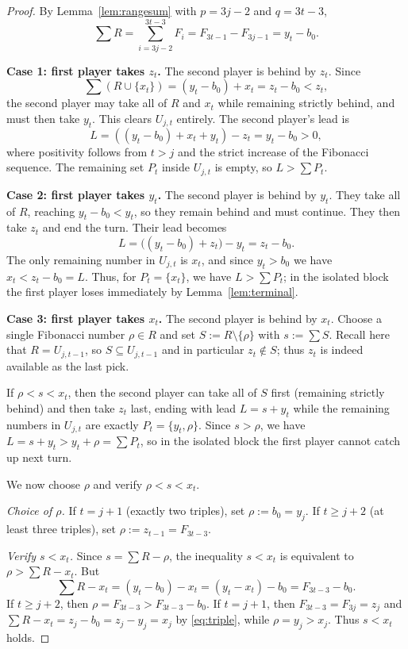 \documentclass[11pt]{article}
\begin{document}
\begin{proof}
By Lemma~\ref{lem:rangesum} with $p=3j-2$ and $q=3t-3$,
\[
\sum R=\sum_{i=3j-2}^{3t-3}F_i = F_{3t-1}-F_{3j-1}=y_t-b_0.
\]

\medskip\noindent
\textbf{Case 1: first player takes $z_t$.}
The second player is behind by $z_t$.
Since
\[
\sum(R\cup\{x_t\})=(y_t-b_0)+x_t=z_t-b_0<z_t,
\]
the second player may take all of $R$ and $x_t$ while remaining strictly behind, and must then take $y_t$.
This clears $U_{j,t}$ entirely. The second player's lead is
\[
L=((y_t-b_0)+x_t+y_t)-z_t=y_t-b_0>0,
\]
where positivity follows from $t>j$ and the strict increase of the Fibonacci sequence.
The remaining set $P_t$ inside $U_{j,t}$ is empty, so $L>\sum P_t$.

\medskip\noindent
\textbf{Case 2: first player takes $y_t$.}
The second player is behind by $y_t$.
They take all of $R$, reaching $y_t-b_0<y_t$, so they remain behind and must continue.
They then take $z_t$ and end the turn.
Their lead becomes
\[
L=\bigl((y_t-b_0)+z_t\bigr)-y_t=z_t-b_0.
\]
The only remaining number in $U_{j,t}$ is $x_t$, and since $y_t>b_0$ we have $x_t<z_t-b_0=L$.
Thus, for $P_t=\{x_t\}$, we have $L>\sum P_t$; in the isolated block the first player loses immediately by Lemma~\ref{lem:terminal}.

\medskip\noindent
\textbf{Case 3: first player takes $x_t$.}
The second player is behind by $x_t$.
Choose a single Fibonacci number $\rho\in R$ and set $S:=R\setminus\{\rho\}$ with $s:=\sum S$.
Recall here that $R=U_{j,t-1}$, so $S\subseteq U_{j,t-1}$ and in particular $z_t\notin S$;
thus $z_t$ is indeed available as the last pick.

If $\rho<s<x_t$, then the second player can take all of $S$ first (remaining strictly behind) and then take $z_t$ last,
ending with lead $L=s+y_t$ while the remaining numbers in $U_{j,t}$ are exactly $P_t=\{y_t,\rho\}$. Since $s>\rho$,
we have $L=s+y_t>y_t+\rho=\sum P_t$, so in the isolated block the first player cannot catch up next turn.

We now choose $\rho$ and verify $\rho<s<x_t$.

\smallskip\noindent
\emph{Choice of $\rho$.}
If $t=j+1$ (exactly two triples), set $\rho:=b_0=y_j$.
If $t\ge j+2$ (at least three triples), set $\rho:=z_{t-1}=F_{3t-3}$.

\smallskip\noindent
\emph{Verify $s<x_t$.}
Since $s=\sum R-\rho$, the inequality $s<x_t$ is equivalent to $\rho>\sum R-x_t$.
But
\[
\sum R-x_t=(y_t-b_0)-x_t=(y_t-x_t)-b_0 = F_{3t-3}-b_0.
\]
If $t\ge j+2$, then $\rho=F_{3t-3}>F_{3t-3}-b_0$.
If $t=j+1$, then $F_{3t-3}=F_{3j}=z_j$ and $\sum R-x_t=z_j-b_0=z_j-y_j=x_j$ by \eqref{eq:triple}, while $\rho=y_j>x_j$.
Thus $s<x_t$ holds.


\end{proof}
\end{document}
